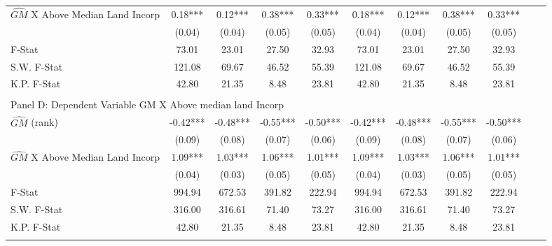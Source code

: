 \begin{table}[htbp]
\begin{threeparttable}
\begin{tabular}{l*{10}{c}}
\addlinespace
$\hat{GM}$ X Above Median Land Incorp&       0.18***&       0.12***&       0.38***&       0.33***&       0.18***&       0.12***&       0.38***&       0.33***\\
                &     (0.04)   &     (0.04)   &     (0.05)   &     (0.05)   &     (0.04)   &     (0.04)   &     (0.05)   &     (0.05)   \\
\midrule
F-Stat          &      73.01   &      23.01   &      27.50   &      32.93   &      73.01   &      23.01   &      27.50   &      32.93   \\
S.W. F-Stat     &     121.08   &      69.67   &      46.52   &      55.39   &     121.08   &      69.67   &      46.52   &      55.39   \\
K.P. F-Stat     &      42.80   &      21.35   &       8.48   &      23.81   &      42.80   &      21.35   &       8.48   &      23.81   \\
\cmidrule[\heavyrulewidth](lr){1-9} \\ \cmidrule[\heavyrulewidth](lr){1-9}
\multicolumn{8}{l}{Panel D: Dependent Variable GM X Above median land Incorp}\\
\cmidrule(lr){1-9}
$\hat{GM}$ (rank)&      -0.42***&      -0.48***&      -0.55***&      -0.50***&      -0.42***&      -0.48***&      -0.55***&      -0.50***\\
                &     (0.09)   &     (0.08)   &     (0.07)   &     (0.06)   &     (0.09)   &     (0.08)   &     (0.07)   &     (0.06)   \\
\addlinespace
$\hat{GM}$ X Above Median Land Incorp&       1.09***&       1.03***&       1.06***&       1.01***&       1.09***&       1.03***&       1.06***&       1.01***\\
                &     (0.04)   &     (0.03)   &     (0.05)   &     (0.05)   &     (0.04)   &     (0.03)   &     (0.05)   &     (0.05)   \\
\midrule
F-Stat          &     994.94   &     672.53   &     391.82   &     222.94   &     994.94   &     672.53   &     391.82   &     222.94   \\
S.W. F-Stat     &     316.00   &     316.61   &      71.40   &      73.27   &     316.00   &     316.61   &      71.40   &      73.27   \\
K.P. F-Stat     &      42.80   &      21.35   &       8.48   &      23.81   &      42.80   &      21.35   &       8.48   &      23.81   \\
\cmidrule[\heavyrulewidth](lr){1-9} \\ \cmidrule[\heavyrulewidth](lr){1-9}

\end{tabular}
\end{threeparttable}
\end{table}
